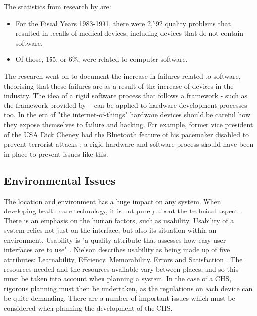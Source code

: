 The statistics from research by \cite{mdfail} are: 
\begin{itemize}
\item For the Fiscal Years 1983-1991, there were 2,792 quality problems that resulted in recalls of medical devices, including devices that do not contain software. 
\item Of those, 165, or 6\%, were related to computer software.
\end{itemize}

The research went on to document the increase in failures related to software, theorising that these failures are as a result of the increase of devices in the industry. The idea of a rigid software process that follows a framework - such as the framework provided by \cite{shroff} – can be applied to hardware development processes too. In the era of "the internet-of-things" hardware devices should be careful how they expose themselves to failure and hacking. For example, former vice president of the USA Dick Cheney had the Bluetooth feature of his pacemaker disabled to prevent terrorist attacks \parencite{pacemaker}; a rigid hardware and software process should have been in place to prevent issues like this.


\subsection{Environmental Issues}

The location and environment has a huge impact on any system. When developing health care technology, it is not purely about the technical aspect \parencite{env}. There is an emphasis on the human factors, such as usability. Usability of a system relies not just on the interface, but also its situation within an environment. Usability is "a quality attribute that assesses how easy user interfaces are to use" \parencite{usability1}. Nielson describes usability as being made up of five attributes: Learnability, Effciency, Memorability, Errors and Satisfaction \parencite{usability2}. The resources needed and the resources available vary between places, and so this must be taken into account when planning a system. In the case of a CHS, rigorous planning must then be undertaken, as the regulations on each device can be quite demanding. There are a number of important issues which must be considered when planning the development of the CHS.

